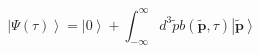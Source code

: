 \begin{equation}\left|\Psi(\tau)\right\rangle=
\left|0\right\rangle+\int_{-\infty}^{\infty} d^3\tilde{p}b(\tilde{\mathbf{p}},\tau)\left|\tilde{\mathbf{p}}\right\rangle
 \label{e6} \end{equation}

